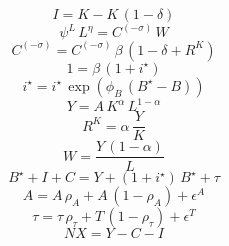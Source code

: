 \noindent[name= `Ley de acumuluación del capital']
\begin{dmath}
{I}={K}-{K}\, \left(1-{\delta}\right)
\end{dmath}
\noindent[name= `Oferta de trabajo']
\begin{dmath}
{\psi^L}\, {L}^{{\eta}}={C}^{\left(-{\sigma}\right)}\, {W}
\end{dmath}
\noindent[name= `Ecuación de Euler']
\begin{dmath}
{C}^{\left(-{\sigma}\right)}={C}^{\left(-{\sigma}\right)}\, {\beta}\, \left(1-{\delta}+{R^{K}}\right)
\end{dmath}
\noindent[name= `Demanda de bonos']
\begin{dmath}
1={\beta}\, \left(1+{i^{\star}}\right)
\end{dmath}
\noindent[name= `Tasa de interés de la deuda']
\begin{dmath}
{i^{\star}}={i^{\star}}\, \exp\left({\phi_{B}}\, \left({B^{\star}}-{B}\right)\right)
\end{dmath}
\noindent[name= `Función de producción']
\begin{dmath}
{Y}={A}\, {K}^{{\alpha}}\, {L}^{1-{\alpha}}
\end{dmath}
\noindent[name= `Demanda de capital']
\begin{dmath}
{R^{K}}={\alpha}\, \frac{{Y}}{{K}}
\end{dmath}
\noindent[name= `Demanda de trabajo']
\begin{dmath}
{W}=\frac{{Y}\, \left(1-{\alpha}\right)}{{L}}
\end{dmath}
\noindent[name= `Demanda agregada']
\begin{dmath}
{B^{\star}}+{I}+{C}={Y}+\left(1+{i^{\star}}\right)\, {B^{\star}}+{\tau}
\end{dmath}
\noindent[name= `Productividad']
\begin{dmath}
{A}={A}\, {\rho_{A}}+{A}\, \left(1-{\rho_{A}}\right)+{\epsilon^{A}}
\end{dmath}
\noindent[name= `Transferencias']
\begin{dmath}
{\tau}={\tau}\, {\rho_{\tau}}+{T}\, \left(1-{\rho_{\tau}}\right)+{\epsilon^{T}}
\end{dmath}
\noindent[name= `Exportaciones netas']
\begin{dmath}
{NX}={Y}-{C}-{I}
\end{dmath}
